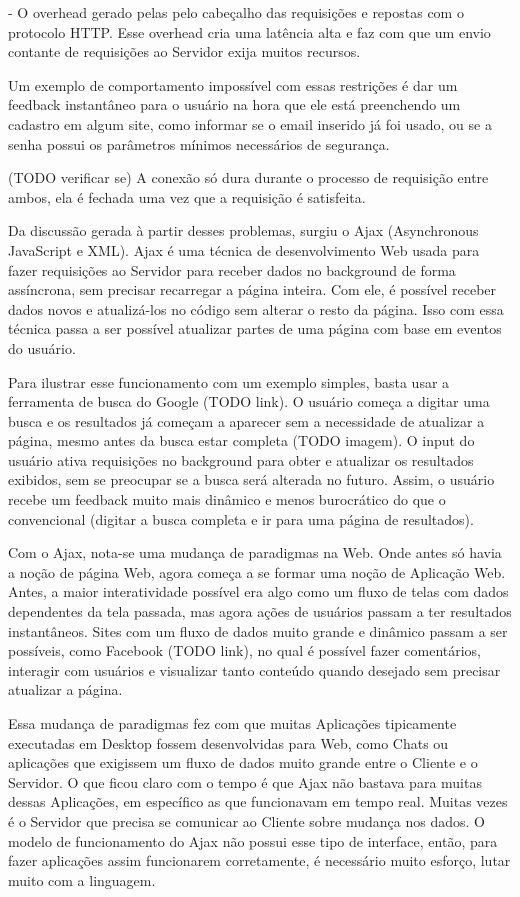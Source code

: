 \documentclass[a4paper,12pt]{article}
\begin{document}
- O overhead gerado pelas pelo cabeçalho das requisições e repostas com o protocolo HTTP. Esse overhead cria uma latência alta e faz com que um envio contante de requisições ao Servidor exija muitos recursos.

Um exemplo de comportamento impossível com essas restrições é dar um feedback instantâneo para o usuário na hora que ele está preenchendo um cadastro em algum site, como informar se o email inserido já foi usado, ou se a senha possui os parâmetros mínimos necessários de segurança.

(TODO verificar se) A conexão só dura durante o processo de requisição entre ambos, ela é fechada uma vez que a requisição é satisfeita.

Da discussão gerada à partir desses problemas, surgiu o Ajax (Asynchronous JavaScript e XML). Ajax é uma técnica de desenvolvimento Web usada para fazer requisições ao Servidor para receber dados no background de forma assíncrona, sem precisar recarregar a página inteira. Com ele, é possível receber dados novos e atualizá-los no código sem alterar o resto da página. Isso com essa técnica passa a ser possível atualizar partes de uma página com base em eventos do usuário.

Para ilustrar esse funcionamento com um exemplo simples, basta usar a ferramenta de busca do Google (TODO link). O usuário começa a digitar uma busca e os resultados já começam a aparecer sem a necessidade de atualizar a página, mesmo antes da busca estar completa (TODO imagem). O input do usuário ativa requisições no background para obter e atualizar os resultados exibidos, sem se preocupar se a busca será alterada no futuro. Assim, o usuário recebe um feedback muito mais dinâmico e menos burocrático do que o convencional (digitar a busca completa e ir para uma página de resultados).

Com o Ajax, nota-se uma mudança de paradigmas na Web. Onde antes só havia a noção de página Web, agora começa a se formar uma noção de Aplicação Web. Antes, a maior interatividade possível era algo como um fluxo de telas com dados dependentes da tela passada, mas agora ações de usuários passam a ter resultados instantâneos. Sites com um fluxo de dados muito grande e dinâmico passam a ser possíveis, como Facebook (TODO link), no qual é possível fazer comentários, interagir com usuários e visualizar tanto conteúdo quando desejado sem precisar atualizar a página.

Essa mudança de paradigmas fez com que muitas Aplicações tipicamente executadas em Desktop fossem desenvolvidas para Web, como Chats ou aplicações que exigissem um fluxo de dados muito grande entre o Cliente e o Servidor. O que ficou claro com o tempo é que Ajax não bastava para muitas dessas Aplicações, em específico as que funcionavam em tempo real. Muitas vezes é o Servidor que precisa se comunicar ao Cliente sobre mudança nos dados. O modelo de funcionamento do Ajax não possui esse tipo de interface, então, para fazer aplicações assim funcionarem corretamente, é necessário muito esforço, lutar muito com a linguagem.
\end{document}
